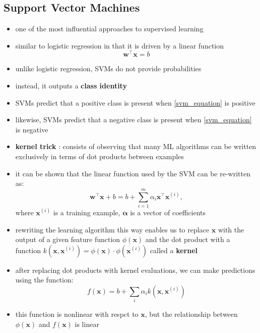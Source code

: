 \documentclass[11pt, twocolumn]{report}
\begin{document}
\subsection{Support Vector Machines}
\begin{itemize}
  \item one of the most influential approaches to supervised learning
  \item similar to logistic regression in that it is driven by a linear
    function 
    \begin{equation}
      \label{svm_equation}
      \bm{w}^\intercal\bm{x} = b
    \end{equation}
  \item unlike logistic regression, SVMs do not provide probabilities
  \item instead, it outputs a \textbf{class identity}
  \item SVMs predict that a positive class is present when \ref{svm_equation}
    is positive
  \item likewise, SVMs predict that a negative class is present when
    \ref{svm_equation} is negative
  \item \textbf{kernel trick} : consists of observing that many ML algorithms
    can be written exclusively in terms of dot products between examples
  \item it can be shown that the linear function used by the SVM can be
    re-written as:
    \begin{equation}
      \bm{w}^\intercal\bm{x} + b = b + \sum_{i=1}^m \alpha_i \bm{x}^\intercal
      \bm{x}^{(i)},
    \end{equation}
    where $\bm{x}^{(i)}$ is a training example, $\bm{\alpha}$ is a vector of
    coefficients
  \item rewriting the learning algorithm this way enables us to replace
    $\bm{x}$ with the output of a given feature function $\phi(\bm{x})$ and the
    dot product with a function $k(\bm{x},\bm{x}^{(i)}) = \phi(\bm{x}) \cdot
    \phi(\bm{x}^{(i)})$ called a \textbf{kernel}
  \item after replacing dot products with kernel evaluations, we can make
    predictions using the function:
    \begin{equation}
      f(\bm{x}) = b + \sum_i \alpha_i k(\bm{x}, \bm{x}^{(i)})
    \end{equation}
  \item this function is nonlinear with respct to $\bm{x}$, but the
    relationship between $\phi(\bm{x})$ and $f(\bm{x})$ is linear

\end{itemize}
\end{document}
